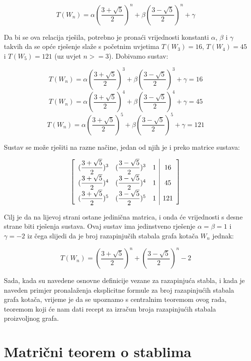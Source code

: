 \documentclass[times, utf8, zavrsni]{fer}
\begin{document}
\[T(W_n) = \alpha(\dfrac{3 + \sqrt{5}}{2})^n + \beta(\dfrac{3 - \sqrt{5}}{2})^n + \gamma\]

Da bi se ova relacija rješila, potrebno je pronaći vrijednosti konstanti $\alpha$, $\beta$ i $\gamma$ takvih da se opće rješenje slaže s početnim uvjetima $T(W_3) = 16$, $T(W_4) = 45$ i $T(W_5) = 121$ (uz uvjet $n >= 3$). Dobivamo sustav:

\[T(W_n) = \alpha(\dfrac{3 + \sqrt{5}}{2})^3 + \beta(\dfrac{3 - \sqrt{5}}{2})^3 + \gamma = 16\]
\[T(W_n) = \alpha(\dfrac{3 + \sqrt{5}}{2})^4 + \beta(\dfrac{3 - \sqrt{5}}{2})^4 + \gamma = 45\]
\[T(W_n) = \alpha(\dfrac{3 + \sqrt{5}}{2})^5 + \beta(\dfrac{3 - \sqrt{5}}{2})^5 + \gamma = 121\]

Sustav se može rješiti na razne načine, jedan od njih je i preko matrice sustava:

\[
\centering 
\begin{bmatrix}
	\begin{array}{ccc|c}
		(\dfrac{3 + \sqrt{5}}{2})^3 & (\dfrac{3 - \sqrt{5}}{2})^3 & 1 & 16 \\
		(\dfrac{3 + \sqrt{5}}{2})^4 & (\dfrac{3 - \sqrt{5}}{2})^4 & 1 & 45 \\
		(\dfrac{3 + \sqrt{5}}{2})^5 & (\dfrac{3 - \sqrt{5}}{2})^5 & 1 & 121 \\
	\end{array}
\end{bmatrix}
\]

Cilj je da na lijevoj strani ostane jedinična matrica, i onda će vrijednosti s desne strane biti rješenja sustava. Ovaj sustav ima jedinstveno rješenje $\alpha = \beta = 1$ i $\gamma = -2$ iz čega slijedi da je broj razapinjučih stabala grafa kotača $W_n$ jednak:

\begin{equation}
T(W_n) = (\dfrac{3 + \sqrt{5}}{2})^n + (\dfrac{3 - \sqrt{5}}{2})^n - 2
\end{equation}

Sada, kada su navedene osnovne definicije vezane za razapinjuća stabla, i kada je naveden primjer pronalaženja eksplicitne formule za broj razapinjućih stabala grafa kotača, vrijeme je da se upoznamo s centralnim teoremom ovog rada, teoremom koji će nam dati recept za izračun broja razapinjućih stabala proizvoljnog grafa.

\chapter{Matrični teorem o stablima}
\end{document}
